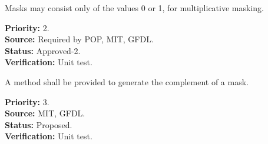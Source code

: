 Masks may consist only of the values 0 or 1, for multiplicative masking.
\begin{reqlist}
{\bf Priority:} 2. \\
{\bf Source:} Required by POP, MIT, GFDL. \\
{\bf Status:} Approved-2. \\
{\bf Verification:} Unit test. 
\end{reqlist}

A method shall be provided to generate the complement of a mask.
\begin{reqlist}
{\bf Priority:} 3. \\
{\bf Source:} MIT, GFDL. \\
{\bf Status:} Proposed. \\
{\bf Verification:} Unit test.
\end{reqlist}


